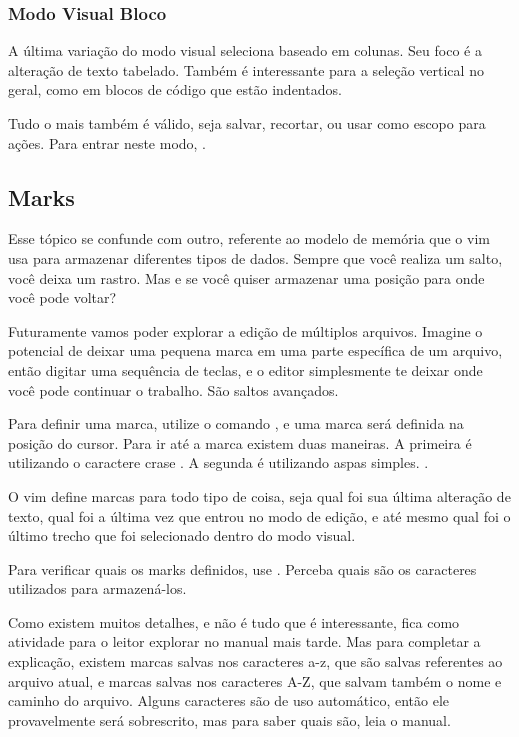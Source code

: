 \subsubsection{Modo Visual Bloco}
A última variação do modo visual seleciona baseado em colunas.
Seu foco é a alteração de texto tabelado.
Também é interessante para a seleção vertical no geral, como em blocos de código que estão indentados.

Tudo o mais também é válido, seja salvar, recortar, ou usar como escopo para ações.
Para entrar neste modo, .

\subsection{Marks}
Esse tópico se confunde com outro, referente ao modelo de memória que o vim usa para armazenar diferentes tipos de dados.
Sempre que você realiza um salto, você deixa um rastro.
Mas e se você quiser armazenar uma posição para onde você pode voltar?

Futuramente vamos poder explorar a edição de múltiplos arquivos.
Imagine o potencial de deixar uma pequena marca em uma parte específica de um arquivo,
então digitar uma sequência de teclas, e o editor simplesmente te deixar onde você pode continuar o trabalho.
São saltos avançados.

Para definir uma marca, utilize o comando , e uma marca será definida na posição do cursor.
Para ir até a marca existem duas maneiras.
A primeira é utilizando o caractere crase \vimcommand{\`}.
A segunda é utilizando aspas simples. .

O vim define marcas para todo tipo de coisa, seja qual foi sua última alteração de texto,
qual foi a última vez que entrou no modo de edição,
e até mesmo qual foi o último trecho que foi selecionado dentro do modo visual.

Para verificar quais os marks definidos, use . Perceba quais são os caracteres utilizados para armazená-los.

Como existem muitos detalhes, e não é tudo que é interessante, fica como atividade para o leitor explorar no manual mais tarde.
Mas para completar a explicação, existem marcas salvas nos caracteres a-z, 
que são salvas referentes ao arquivo atual, e marcas salvas nos caracteres A-Z,
que salvam também o nome e caminho do arquivo.
Alguns caracteres são de uso automático, então ele provavelmente será sobrescrito, mas para saber quais são, leia o manual.

\newpage
